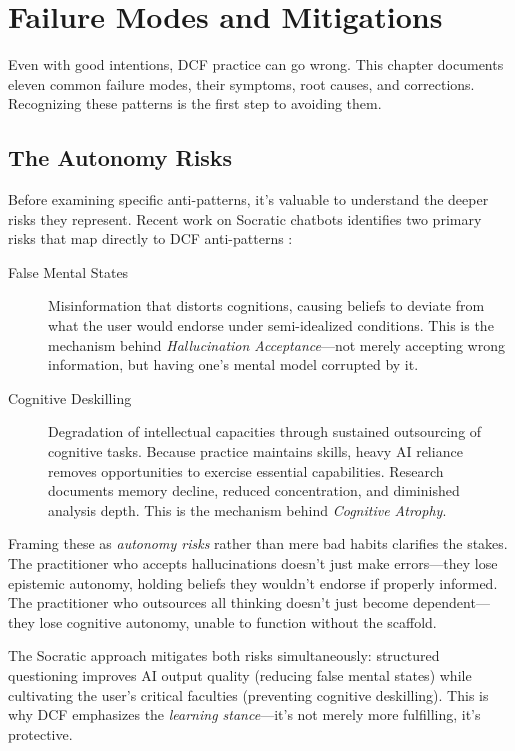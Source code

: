 \chapter{Failure Modes and Mitigations}\label{ch:failure-modes}

Even with good intentions, DCF practice can go wrong. This chapter documents eleven common failure modes, their symptoms, root causes, and corrections. Recognizing these patterns is the first step to avoiding them.

\section{The Autonomy Risks}

Before examining specific anti-patterns, it's valuable to understand the deeper risks they represent. Recent work on Socratic chatbots identifies two primary risks that map directly to DCF anti-patterns \cite{socrai2025autonomy}:

\begin{description}
    \item[False Mental States] Misinformation that distorts cognitions, causing beliefs to deviate from what the user would endorse under semi-idealized conditions. This is the mechanism behind \emph{Hallucination Acceptance}---not merely accepting wrong information, but having one's mental model corrupted by it.

    \item[Cognitive Deskilling] Degradation of intellectual capacities through sustained outsourcing of cognitive tasks. Because practice maintains skills, heavy AI reliance removes opportunities to exercise essential capabilities. Research documents memory decline, reduced concentration, and diminished analysis depth. This is the mechanism behind \emph{Cognitive Atrophy}.
\end{description}

Framing these as \emph{autonomy risks} rather than mere bad habits clarifies the stakes. The practitioner who accepts hallucinations doesn't just make errors---they lose epistemic autonomy, holding beliefs they wouldn't endorse if properly informed. The practitioner who outsources all thinking doesn't just become dependent---they lose cognitive autonomy, unable to function without the scaffold.

The Socratic approach mitigates both risks simultaneously: structured questioning improves AI output quality (reducing false mental states) while cultivating the user's critical faculties (preventing cognitive deskilling). This is why DCF emphasizes the \emph{learning stance}---it's not merely more fulfilling, it's protective.

